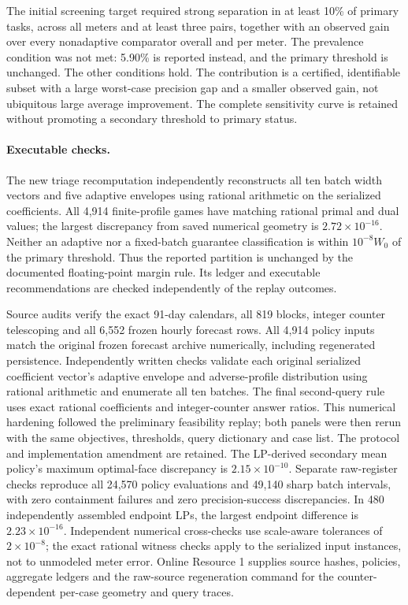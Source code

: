 The initial screening target required strong separation in at least 10\%
of primary tasks, across all meters and at least three pairs, together
with an observed gain over every nonadaptive comparator overall and per
meter. The prevalence condition was not met: 5.90\% is reported instead,
and the primary threshold is unchanged. The other conditions hold.
The contribution is a certified, identifiable subset with a large
worst-case precision gap and a smaller observed gain, not ubiquitous
large average improvement. The complete sensitivity curve is retained
without promoting a secondary threshold to primary status.

\paragraph{Executable checks.}
The new triage recomputation independently reconstructs all ten batch
width vectors and five adaptive envelopes using rational arithmetic on
the serialized coefficients. All 4,914 finite-profile games have matching
rational primal and dual values; the largest discrepancy from saved
numerical geometry is $2.72\times10^{-16}$. Neither an adaptive nor a
fixed-batch guarantee classification is within $10^{-8}W_0$ of the primary
threshold. Thus the reported partition is unchanged by the documented
floating-point margin rule. Its ledger and executable recommendations are
checked independently of the replay outcomes.

Source audits verify the exact 91-day calendars, all 819 blocks, integer
counter telescoping and all 6,552 frozen hourly forecast rows. All 4,914
policy inputs match the original frozen forecast archive numerically,
including regenerated persistence. Independently written checks validate
each original serialized coefficient vector's adaptive envelope and
adverse-profile distribution using rational arithmetic and enumerate all
ten batches. The final second-query rule uses exact rational coefficients
and integer-counter answer ratios. This numerical hardening followed the
preliminary feasibility replay; both panels were then rerun with the same
objectives, thresholds, query dictionary and case list. The protocol and
implementation amendment are retained. The LP-derived secondary mean policy's
maximum optimal-face discrepancy is $2.15\times10^{-10}$.
Separate raw-register checks reproduce all 24,570 policy evaluations and
49,140 sharp batch intervals, with zero containment failures and zero
precision-success discrepancies. In 480 independently assembled endpoint
LPs, the largest endpoint difference is $2.23\times10^{-16}$.
Independent numerical cross-checks use scale-aware tolerances of $2\times10^{-8}$;
the exact rational witness checks apply to the serialized input instances,
not to unmodeled meter error. Online Resource 1 supplies source hashes,
policies, aggregate ledgers and the raw-source regeneration command for
the counter-dependent per-case geometry and query traces.

